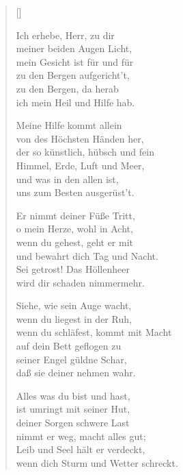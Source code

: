 \begin{multicols}{2}
\settowidth{\versewidth}{wenn dich Sturm und Wetter schreckt.}
\begin{verse}[\versewidth]

 Ich erhebe, Herr, zu dir\\
meiner beiden Augen Licht,\\
mein Gesicht ist für und für\\
zu den Bergen aufgericht't,\\
zu den Bergen, da herab\\
ich mein Heil und Hilfe hab.

 Meine Hilfe kommt allein\\
von des Höchsten Händen her,\\
der so künstlich, hübsch und fein\\
Himmel, Erde, Luft und Meer,\\
und was in den allen ist,\\
uns zum Besten ausgerüst't.

 Er nimmt deiner Füße Tritt,\\
o mein Herze, wohl in Acht,\\
wenn du gehest, geht er mit\\
und bewahrt dich Tag und Nacht.\\
Sei getrost! Das Höllenheer\\
wird dir schaden nimmermehr.

 Siehe, wie sein Auge wacht,\\
wenn du liegest in der Ruh,\\
wenn du schläfest, kommt mit Macht\\
auf dein Bett geflogen zu\\
seiner Engel güldne Schar,\\
daß sie deiner nehmen wahr.

 Alles was du bist und hast,\\
ist umringt mit seiner Hut,\\
deiner Sorgen schwere Last\\
nimmt er weg, macht alles gut;\\
Leib und Seel hält er verdeckt,\\
wenn dich Sturm und Wetter schreckt.


\end{verse}
\end{multicols}
